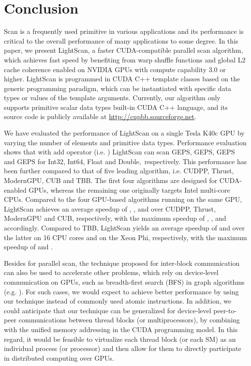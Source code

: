 \documentclass[article]{elsarticle}
\renewcommand{\hl}[1]{#1}
\begin{document}
{\section{Conclusion}
Scan is a frequently used primitive in various applications and its performance is critical to the overall performance of many applications to some degree. In this paper, we present LightScan, a faster CUDA-compatible parallel scan algorithm, which achieves fast speed by benefiting from warp shuffle functions and global L2 cache coherence enabled on NVIDIA GPUs with compute capability 3.0 or higher. \hl{LightScan is programmed in CUDA C++ template classes based on the generic programming paradigm, which can be instantiated with specific data types or values of the template arguments. Currently, our algorithm only supports primitive scalar data types built-in CUDA C++ language, and its source code is publicly available at \url{http://cupbb.sourceforge.net}.}

We have evaluated the performance of LightScan on a single Tesla K40c GPU by varying the number of elements and primitive data types. Performance evaluation shows that with add operator (i.e. ) LightScan can scan  GEPS,  GEPS,  GEPS and  GEPS for Int32, Int64, Float and Double,\ respectively. This performance has been further compared to that of five leading algorithm, i.e. CUDPP, Thrust, ModernGPU, CUB and TBB. The first four algorithms are designed for CUDA-enabled GPUs, whereas the remaining one originally targets Intel multi-core CPUs. Compared to the four GPU-based algorithms running on the same GPU, LightScan achieves an average speedup of , ,  and  over CUDPP, Thrust, ModernGPU and CUB, respectively, with the maximum speedup of , ,  and  accordingly. Compared to TBB, LightScan yields an average speedup of  and  over the latter on 16 CPU cores and on the Xeon Phi, respectively, with the maximum speedup of  and .

Besides for parallel scan, the technique proposed for inter-block communication can also be used to accelerate other problems, which rely on device-level communication on GPUs, such as breadth-first search (BFS) in graph algorithms (e.g. \cite{luo2010effective}). For such cases, we would expect to achieve better performance by using our technique instead of commonly used atomic instructions. In addition, we could anticipate that our technique can be generalized for device-level peer-to-peer communications between thread blocks (or multiprocessors), by combining with the unified memory addressing in the CUDA programming model. In this regard, it would be feasible to virtualize each thread block (or each SM) as an individual process (or processor) and then allow for them to directly participate in distributed computing over GPUs.
}
\end{document}
